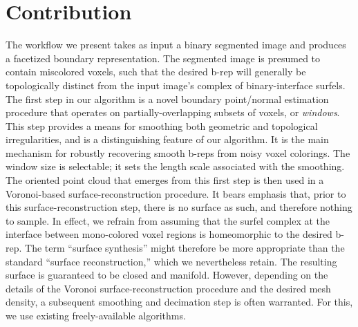 \section{Contribution}
\label{sec:Contribution}

The workflow we present takes as input a binary segmented image and produces a facetized boundary representation.  The segmented image is presumed to contain miscolored voxels, such that the desired b-rep will generally be topologically distinct from the input image's complex of binary-interface surfels.  The first step in our algorithm is a novel boundary point/normal estimation procedure that operates on partially-overlapping subsets of voxels, or {\em windows}.  This step provides a means for smoothing both geometric and topological irregularities, and is a distinguishing feature of our algorithm.  It is the main mechanism for robustly recovering smooth b-reps from noisy voxel colorings.  The window size is selectable; it sets the length scale associated with the smoothing.  The oriented point cloud that emerges from this first step is then used in a Voronoi-based surface-reconstruction procedure.  It bears emphasis that, prior to this surface-reconstruction step, there is no surface as such, and therefore nothing to sample.  In effect, we refrain from assuming that the surfel complex at the interface between mono-colored voxel regions is homeomorphic to the desired b-rep.  The term ``surface synthesis'' might therefore be more appropriate than the standard ``surface reconstruction,'' which we nevertheless retain. The resulting surface is guaranteed to be closed and manifold.  However, depending on the details of the Voronoi surface-reconstruction procedure and the desired mesh density, a subsequent smoothing and decimation step is often warranted.  For this, we use existing freely-available algorithms.

